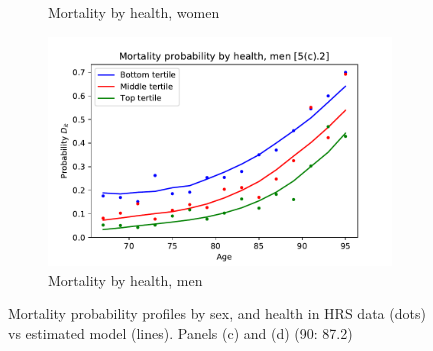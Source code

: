 \documentclass[12pt,pdftex,letterpaper]{article}
\begin{document}
\begin{figure}[h!]
\begin{subfigure}[b]{0.49\textwidth}
        \caption{Mortality by health, women}
    \end{subfigure}
    \begin{subfigure}[b]{0.49\textwidth}
        \centering
        \includegraphics[width=\textwidth]{../Figures/MortByHealthAgeMen.pdf}
        \caption{Mortality by health, men}
    \end{subfigure}
    \caption{Mortality probability profiles by sex, and health in HRS data (dots) vs estimated model (lines). Panels (c) and (d) (90: 87.2)}
    \label{fig:MomentCat5}
\end{figure}
\end{document}
